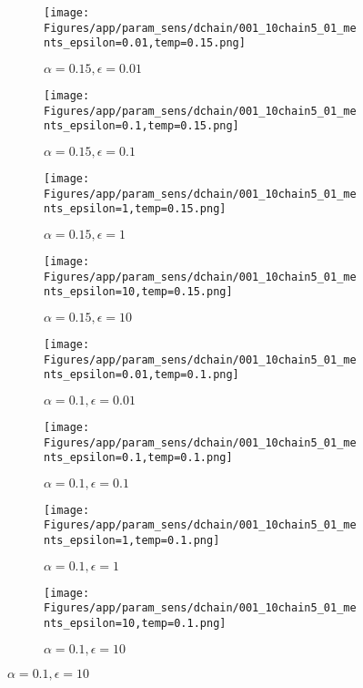 \documentclass{article}
\theoremstyle{plain}
\begin{document}
\begin{appendices}
\begin{figure}
                \begin{subfigure}[b]{0.24\textwidth}
                    \centering
                    \texttt{[image: Figures/app/param\_sens/dchain/001\_10chain5\_01\_ments\_epsilon=0.01,temp=0.15.png]}
                    \caption*{$\alpha=0.15,\epsilon=0.01$}
                \end{subfigure}
                \begin{subfigure}[b]{0.24\textwidth}
                    \centering
                    \texttt{[image: Figures/app/param\_sens/dchain/001\_10chain5\_01\_ments\_epsilon=0.1,temp=0.15.png]}
                    \caption*{$\alpha=0.15,\epsilon=0.1$}
                \end{subfigure}
                \begin{subfigure}[b]{0.24\textwidth}
                    \centering
                    \texttt{[image: Figures/app/param\_sens/dchain/001\_10chain5\_01\_ments\_epsilon=1,temp=0.15.png]}
                    \caption*{$\alpha=0.15,\epsilon=1$}
                \end{subfigure}
                \begin{subfigure}[b]{0.24\textwidth}
                    \centering
                    \texttt{[image: Figures/app/param\_sens/dchain/001\_10chain5\_01\_ments\_epsilon=10,temp=0.15.png]}
                    \caption*{$\alpha=0.15,\epsilon=10$}
                \end{subfigure}
                
                \begin{subfigure}[b]{0.24\textwidth}
                    \centering
                    \texttt{[image: Figures/app/param\_sens/dchain/001\_10chain5\_01\_ments\_epsilon=0.01,temp=0.1.png]}
                    \caption*{$\alpha=0.1,\epsilon=0.01$}
                \end{subfigure}
                \begin{subfigure}[b]{0.24\textwidth}
                    \centering
                    \texttt{[image: Figures/app/param\_sens/dchain/001\_10chain5\_01\_ments\_epsilon=0.1,temp=0.1.png]}
                    \caption*{$\alpha=0.1,\epsilon=0.1$}
                \end{subfigure}
                \begin{subfigure}[b]{0.24\textwidth}
                    \centering
                    \texttt{[image: Figures/app/param\_sens/dchain/001\_10chain5\_01\_ments\_epsilon=1,temp=0.1.png]}
                    \caption*{$\alpha=0.1,\epsilon=1$}
                \end{subfigure}
                \begin{subfigure}[b]{0.24\textwidth}
                    \centering
                    \texttt{[image: Figures/app/param\_sens/dchain/001\_10chain5\_01\_ments\_epsilon=10,temp=0.1.png]}
                    \caption*{$\alpha=0.1,\epsilon=10$}
                \end{subfigure}
                

\end{figure}
\end{appendices}
\end{document}
